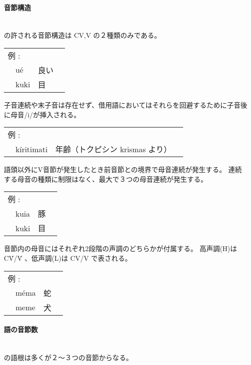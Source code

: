\paragraph{音節構造}\quad\\
\langname の許される音節構造は CV,V の２種類のみである。

\begin{tabular}{llll}
    \multicolumn{2}{l}{例 : } \\ 
    & u\'e & 良い \\
    & kuki & 目 \\
\end{tabular}

子音連続や末子音は存在せず、借用語においてはそれらを回避するために子音後に母音/i/が挿入される。

\begin{tabular}{llll}
    \multicolumn{2}{l}{例 : } \\ 
    & k\'iritimati & 年齢（トクピシン krismas より） \\
\end{tabular}

語頭以外にV音節が発生したとき前音節との境界で母音連続が発生する。
連続する母音の種類に制限はなく、最大で３つの母音連続が発生する。

\begin{tabular}{llll}
    \multicolumn{2}{l}{例 : } \\ 
    & kuia & 豚 \\
    & kuki & 目 \\
\end{tabular}

音節内の母音にはそれぞれ2段階の声調のどちらかが付属する。
高声調(H)は C\'V/\'V 、低声調(L)は CV/V で表される。

\begin{tabular}{llll}
    \multicolumn{2}{l}{例 : } \\ 
    & m\'ema & 蛇 \\
    & meme & 犬 \\
\end{tabular}

\paragraph{語の音節数}\quad\\
\langname の語根は多くが２～３つの音節からなる。

